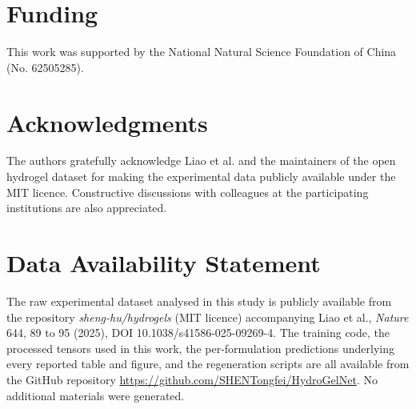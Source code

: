 \documentclass[utf8]{FrontiersinHarvard}
\begin{document}
\section*{Funding}

This work was supported by the National Natural Science Foundation of China (No. 62505285).

\section*{Acknowledgments}

The authors gratefully acknowledge Liao et al. and the maintainers of the open hydrogel dataset for making the experimental data publicly available under the MIT licence. Constructive discussions with colleagues at the participating institutions are also appreciated.

\section*{Data Availability Statement}

The raw experimental dataset analysed in this study is publicly available from the repository \emph{sheng-hu/hydrogels} (MIT licence) accompanying Liao et al., \textit{Nature} 644, 89 to 95 (2025), DOI 10.1038/s41586-025-09269-4. The training code, the processed tensors used in this work, the per-formulation predictions underlying every reported table and figure, and the regeneration scripts are all available from the GitHub repository \url{https://github.com/SHENTongfei/HydroGelNet}. No additional materials were generated.



\end{document}
